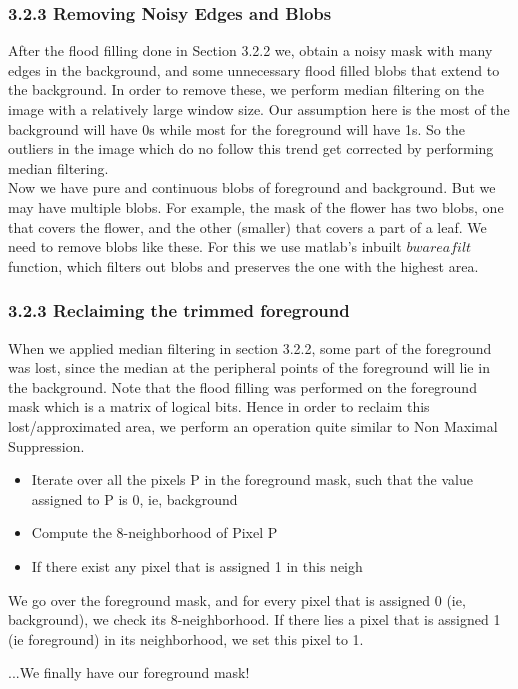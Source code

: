 \documentclass[12pt, a4paper]{article}
\begin{document}
\subsubsection*{3.2.3 Removing Noisy Edges and Blobs}
\quad\quad After the flood filling done in Section 3.2.2 we, obtain a noisy mask with many edges in the background, and some unnecessary flood filled blobs that extend to the background. In order to remove these, we perform median filtering on the image with a relatively large window size. Our assumption here is the most of the background will have 0s while most for the foreground will have 1s. So the outliers in the image which do no follow this trend get corrected by performing median filtering. \\
\null\quad\quad Now we have pure and continuous blobs of foreground and background. But we may have multiple blobs. For example, the mask of the flower has two blobs, one that covers the flower, and the other (smaller) that covers a part of a leaf. We need to remove blobs like these. For this we use matlab's inbuilt $bwareafilt$ function, which filters out blobs and preserves the one with the highest area.

\subsubsection*{3.2.3 Reclaiming the trimmed foreground}
\quad\quad When we applied median filtering in section 3.2.2, some part of the foreground was lost, since the median at the peripheral points of the foreground will lie in the background. Note that the flood filling was performed on the foreground mask which is a matrix of logical bits. Hence in order to reclaim this lost/approximated area, we perform an operation quite similar to Non Maximal Suppression. 
\begin{itemize}
\item Iterate over all the pixels P in the foreground mask, such that the value assigned to P is 0, ie, background
\item Compute the 8-neighborhood of Pixel P
\item If there exist any pixel that is assigned 1 in this neigh	
\end{itemize}
We go over the foreground mask, and for every pixel that is assigned 0 (ie, background), we check its 8-neighborhood. If there lies a pixel that is assigned 1 (ie foreground) in its neighborhood, we set this pixel to 1. 
\begin{flushright}
...We finally have our foreground mask!
\end{flushright} 
\newpage
\end{document}
